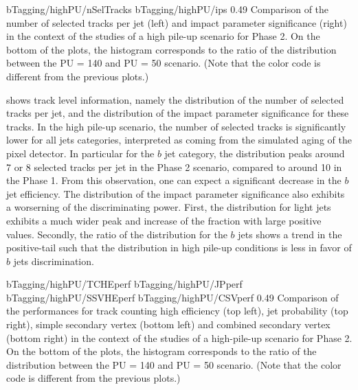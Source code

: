                      {bTagging/highPU/nSelTracks}
                     {bTagging/highPU/ips}
                     {0.49}
                     {Comparison of the number of selected tracks per jet (left) and
                     impact parameter significance (right) in the context of the
                     studies of a high pile-up scenario for Phase 2.
                     On the bottom of the plots, the histogram corresponds
                     to the ratio of the distribution between the PU = 140 and PU = 50
                     scenario.
                     (Note that the color code is different from the previous plots.)
                     }

     shows track level information, namely the
    distribution of the number of selected tracks per jet, and the distribution of the
    impact parameter significance for these tracks. In the high pile-up scenario, the
    number of selected tracks is significantly lower for all jets categories, interpreted
    as coming from the simulated aging of the pixel detector. In particular
    for the $b$ jet category, the distribution peaks around 7 or 8 selected tracks per
    jet in the Phase 2 scenario, compared to around 10 in the Phase 1. From this observation, one
    can expect a significant decrease in the $b$ jet efficiency. The distribution of
    the impact parameter significance also exhibits a worserning of the discriminating
    power. First, the distribution for light jets exhibits a much wider peak and
    increase of the fraction with large positive values. Secondly, the ratio of the
    distribution for the $b$ jets shows a trend in the positive-tail such that the
    distribution in high pile-up conditions is less in favor of $b$ jets discrimination.

                      {bTagging/highPU/TCHEperf}
                      {bTagging/highPU/JPperf}
                      {bTagging/highPU/SSVHEperf}
                      {bTagging/highPU/CSVperf}
                      {0.49}
                      {Comparison of the performances for track counting high efficiency
                      (top left), jet probability (top right), simple secondary vertex 
                      (bottom left) and combined secondary vertex
                      (bottom right) in the context of the studies of a high-pile-up
                      scenario for Phase 2. On the bottom of the plots, the histogram corresponds
                      to the ratio of the distribution between the PU = 140 and PU = 50
                      scenario. (Note that the color code is different from the previous plots.) }

